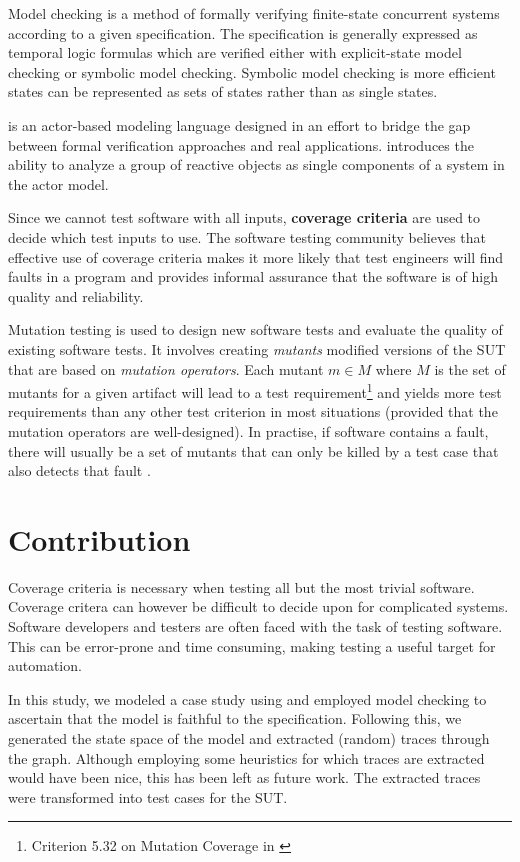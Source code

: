 \documentclass{article}
\begin{document}
		Model checking is a method of formally verifying finite-state concurrent systems according to a given specification. The specification is generally expressed as temporal logic formulas which are verified either with explicit-state model checking or symbolic model checking. Symbolic model checking is more efficient states can be represented as sets of states rather than as single states.

		\Rebeca is an actor-based modeling language designed in an effort to bridge the gap between formal verification approaches and real applications. \Rebeca introduces the ability to analyze a group of reactive objects as single components of a system in the actor model.

		Since we cannot test software with all inputs, \textbf{coverage criteria} are used to decide which test inputs to use. The software testing community believes that effective use of coverage criteria makes it more likely that test engineers will find faults in a program and provides informal assurance that the software is of high quality and reliability. 

		Mutation testing is used to design new software tests and evaluate the quality of existing software tests. It involves creating \textit{mutants} modified versions of the SUT that are based on \textit{mutation operators}. Each mutant $m \in M$ where $M$ is the set of mutants for a given artifact will lead to a test requirement\footnote{Criterion 5.32 on Mutation Coverage in \citet{ammann2008introduction}} and yields more test requirements than any other test criterion in most situations (provided that the mutation operators are well-designed). In practise, if software contains a fault, there will usually be a set of mutants that can only be killed by a test case that also detects that fault \citep{ammann2008introduction}.

	\section{Contribution}
		Coverage criteria is necessary when testing all but the most trivial software. Coverage critera can however be difficult to decide upon for complicated systems. Software developers and testers are often faced with the task of testing software. This can be error-prone and time consuming, making testing a useful target for automation.

		In this study, we modeled a case study using \Rebeca and employed model checking to ascertain that the model is faithful to the specification. Following this, we generated the state space of the model and extracted (random) traces through the graph. Although employing some heuristics for which traces are extracted would have been nice, this has been left as future work. The extracted traces were transformed into test cases for the SUT.
\end{document}
